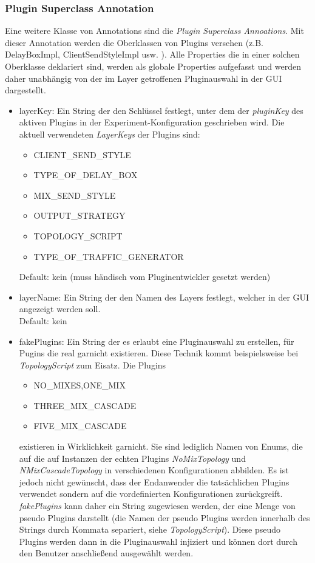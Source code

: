 \documentclass[a4paper, 11pt]{article} %
\begin{document}
\subsubsection{Plugin Superclass Annotation} %
\label{ssub:plugin_annotation}
Eine weitere Klasse von Annotations sind die \emph{Plugin Superclass Annoations}. 
Mit dieser Annotation werden die Oberklassen von Plugins versehen (z.B. DelayBoxImpl, ClientSendStyleImpl usw. ). Alle Properties die in einer solchen Oberklasse deklariert sind, werden als globale Properties aufgefasst und werden daher unabhängig von der im Layer getroffenen Pluginauswahl in der GUI dargestellt. 

\begin{itemize}
	\item layerKey:
	Ein String der den Schlüssel festlegt, unter dem der \emph{pluginKey} des aktiven Plugins in der Experiment-Konfiguration geschrieben wird. Die aktuell verwendeten \emph{LayerKeys} der Plugins sind: 
	\begin{itemize}
		\item CLIENT\_SEND\_STYLE
		\item TYPE\_OF\_DELAY\_BOX
		\item MIX\_SEND\_STYLE
		\item OUTPUT\_STRATEGY
		\item TOPOLOGY\_SCRIPT 
		\item TYPE\_OF\_TRAFFIC\_GENERATOR
	\end{itemize}
	Default: kein (muss händisch vom Pluginentwickler gesetzt werden)
	\item layerName:
	Ein String der den Namen des Layers festlegt, welcher in der GUI angezeigt werden soll.\\
	Default: kein
	\item fakePlugins:
	Ein String der es erlaubt eine Pluginauswahl zu erstellen, für Pugins die real garnicht existieren. Diese Technik kommt beispielsweise bei \emph{TopologyScript} zum Eisatz. Die Plugins  
	\begin{itemize} 
		\item NO\_MIXES,ONE\_MIX
		\item THREE\_MIX\_CASCADE 
		\item FIVE\_MIX\_CASCADE 
	\end{itemize}
	existieren in Wirklichkeit garnicht. Sie sind lediglich Namen von Enums, die auf die auf Instanzen der echten Plugins \emph{NoMixTopology} und \emph{NMixCascadeTopology} in verschiedenen Konfigurationen abbilden. Es ist jedoch nicht gewünscht, dass der Endanwender die tatsächlichen Plugins verwendet sondern auf die vordefinierten Konfigurationen zurückgreift. \emph{fakePlugins} kann daher ein String zugewiesen werden, der eine Menge von pseudo Plugins darstellt (die Namen der pseudo Plugins werden innerhalb des Strings durch Kommata separiert, siehe \emph{TopologyScript}). Diese pseudo Plugins werden dann in die Pluginauswahl injiziert und können dort durch den Benutzer anschließend ausgewählt werden.\\

\end{itemize}
\end{document}
